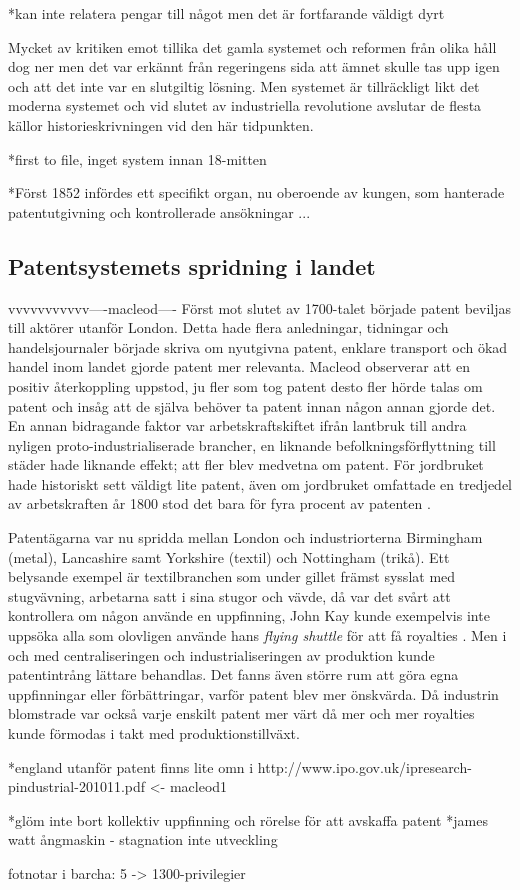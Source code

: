*kan inte relatera pengar till något men det är fortfarande väldigt dyrt

Mycket av kritiken emot tillika det gamla systemet och reformen från olika håll dog ner men det var erkännt från regeringens sida att ämnet skulle tas upp igen och att det inte var en slutgiltig lösning\cite{dutton}. Men systemet är tillräckligt likt det moderna systemet och vid slutet av industriella revolutione avslutar de flesta källor historieskrivningen vid den här tidpunkten.

*first to file, inget system innan 18-mitten

*Först 1852 infördes ett specifikt organ, nu oberoende av kungen, som hanterade patentutgivning och kontrollerade ansökningar ...



\subsection{Patentsystemets spridning i landet}
\label{sub:patentsystemets_spridning_i_landet}

vvvvvvvvvvv----macleod----
Först mot slutet av 1700-talet började patent beviljas till aktörer utanför London. Detta hade flera
anledningar, tidningar och handelsjournaler började skriva om nyutgivna patent, enklare transport och
ökad handel inom landet gjorde patent mer relevanta\cite{macleod}. Macleod observerar att en positiv återkoppling uppstod, ju fler som tog
patent desto fler hörde talas om patent och insåg att de själva behöver ta patent innan någon annan gjorde
det. En annan bidragande faktor var arbetskraftskiftet ifrån lantbruk till andra nyligen
proto-industrialiserade brancher, en liknande befolkningsförflyttning till städer hade liknande effekt;
att fler blev medvetna om patent\cite{macleod}. För jordbruket hade historiskt sett väldigt lite patent, även om
jordbruket omfattade en tredjedel av arbetskraften år 1800 stod det bara för fyra procent av patenten
\cite{macleod2}.

Patentägarna var nu spridda mellan London och industriorterna Birmingham (metal), Lancashire samt
Yorkshire (textil) och Nottingham (trikå). Ett belysande exempel är textilbranchen som under gillet
främst sysslat med stugvävning, arbetarna satt i sina stugor och vävde, då var det svårt att
kontrollera om någon använde en uppfinning, John Kay kunde exempelvis inte uppsöka alla som olovligen
använde hans \emph{flying shuttle} för att få royalties \cite{macleod}. Men i och med centraliseringen och industrialiseringen av produktion kunde patentintrång lättare behandlas. Det fanns även större rum att göra
egna uppfinningar eller förbättringar, varför patent blev mer önskvärda. Då industrin blomstrade var
också varje enskilt patent mer värt då mer och mer royalties kunde förmodas i takt med
produktionstillväxt.


*england utanför patent finns lite omn i http://www.ipo.gov.uk/ipresearch-pindustrial-201011.pdf <- macleod1


*glöm inte bort kollektiv uppfinning och rörelse för att avskaffa patent 
*james watt ångmaskin - stagnation inte utveckling


fotnotar i barcha: 5 -> 1300-privilegier


